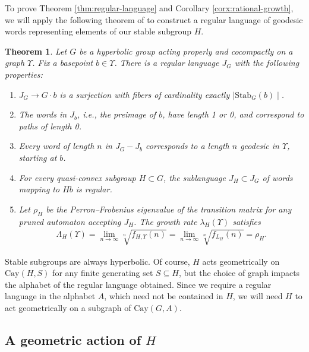 \documentclass[11pt,letterpaper]{amsart}
\newtheorem{theorem}{Theorem}[section]
\theoremstyle{definition}
\theoremstyle{plain}
\theoremstyle{TheoremNum}
\begin{document}
To prove Theorem \ref{thm:regular-language} and Corollary \ref{corx:rational-growth}, we will apply the following theorem of \cite{DFW} to construct a regular language of geodesic words representing elements of our stable subgroup $H$.

\begin{theorem}{\cite[Theorem~6.7]{DFW}}\label{thm:DFW-regular-lang}
        Let $G$ be a hyperbolic group acting properly and cocompactly on a graph $\Upsilon$. Fix a basepoint $b \in \Upsilon$. There is a regular language $J_G$ with the following properties:
        \begin{enumerate}
            \item $J_G \rightarrow G \cdot b$ is a surjection with fibers of cardinality exactly $\mid \text{Stab}_G(b)\mid$.
            \item The words in $J_b$, i.e., the preimage of $b$, have length 1 or 0, and correspond to paths of length 0.
            \item Every word of length $n$ in $J_G - J_b$ corresponds to a length $n$ geodesic in $\Upsilon$, starting at $b$.
            \item For every quasi-convex subgroup $H\subset G$, the sublanguage $J_H \subset J_G$ of words mapping to $Hb$ is regular.
            \item Let $\rho_H$ be the Perron--Frobenius eigenvalue of the transition matrix for any pruned automaton accepting $J_H$. The growth rate $\lambda_H(\Upsilon)$ satisfies 
            \begin{align*}
                \Lambda_H(\Upsilon) = \lim_{n \rightarrow \infty} \sqrt[n]{f_{H,\Upsilon}(n)} =  \lim_{n \rightarrow \infty} \sqrt[n]{f_{L_H}(n)} = \rho_H \text{.}
            \end{align*}
        \end{enumerate}
    \end{theorem}

Stable subgroups are always hyperbolic. Of course, $H$ acts geometrically on $\text{Cay}(H,S)$ for any finite generating set $S \subseteq H$, but the choice of graph impacts the alphabet of the regular language obtained. Since we require a regular language in the alphabet $A$, which need not be contained in $H$, we will need $H$ to act geometrically on a subgraph of $\text{Cay}(G,A)$.

\subsection{A geometric action of $H$}\label{subsec:geom-action-of-H}
\end{document}
